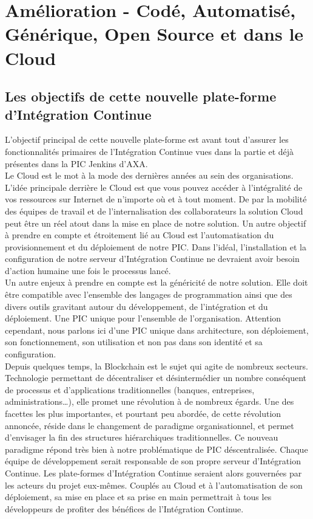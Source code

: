 \chapter{Amélioration - Codé, Automatisé, Générique, Open Source et dans le Cloud}

  \section{Les objectifs de cette nouvelle plate-forme d'Intégration Continue}
  L'objectif principal de cette nouvelle plate-forme est avant tout d'assurer les fonctionnalités primaires de l'Intégration Continue vues dans la partie \label{ContinousIntegration} et déjà présentes dans la PIC Jenkins d'AXA.\\

  Le Cloud est le mot à la mode des dernières années au sein des organisations. L'idée principale derrière le Cloud est que vous pouvez accéder à l'intégralité de vos ressources sur Internet de n'importe où et à tout moment. De par la mobilité des équipes de travail et de l'internalisation des collaborateurs la solution Cloud peut être un réel atout dans la mise en place de notre solution. Un autre objectif à prendre en compte et étroitement lié au Cloud est l'automatisation du provisionnement et du déploiement de notre PIC. Dans l'idéal, l'installation et la configuration de notre serveur d'Intégration Continue ne devraient avoir besoin d'action humaine une fois le processus lancé.\\

  Un autre enjeux à prendre en compte est la généricité de notre solution. Elle doit être compatible avec l'ensemble des langages de programmation ainsi que des divers outils gravitant autour du développement, de l'intégration et du déploiement. Une PIC unique pour l'ensemble de l'organisation. Attention cependant, nous parlons ici d'une PIC unique dans architecture, son déploiement, son fonctionnement, son utilisation et non pas dans son identité et sa configuration.\\

  Depuis quelques temps, la Blockchain est le sujet qui agite de nombreux secteurs. Technologie permettant de décentraliser et désintermédier un nombre conséquent de processus et d’applications traditionnelles (banques, entreprises, administrations…), elle promet une révolution à de nombreux égards. Une des facettes les plus importantes, et pourtant peu abordée, de cette révolution annoncée, réside dans le changement de paradigme organisationnel, et permet d’envisager la fin des structures hiérarchiques traditionnelles. Ce nouveau paradigme répond très bien à notre problématique de PIC déscentralisée. Chaque équipe de développement serait responsable de son propre serveur d'Intégration Continue. Les plate-formes d'Intégration Continue seraient alors gouvernées par les acteurs du projet eux-mêmes. Couplés au Cloud et à l'automatisation de son déploiement, sa mise en place et sa prise en main permettrait à tous les développeurs de profiter des bénéfices de l'Intégration Continue.\\

